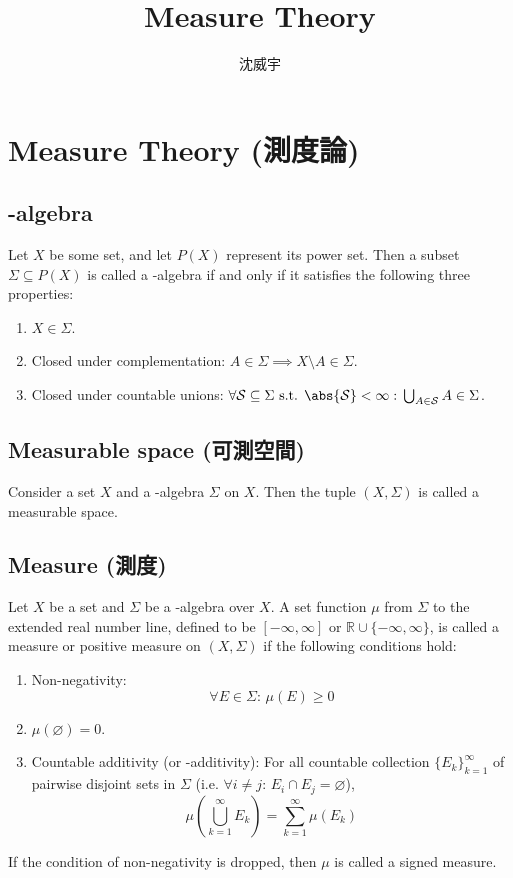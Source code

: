 \documentclass[a4paper,12pt]{article}
\begin{document}
\title{Measure Theory}
\author{沈威宇}
\date{\temtoday}
\titletocdoc
\section{Measure Theory (測度論)}
\subsection{\text{\textsigma}-algebra}
Let $X$ be some set, and let $P(X)$ represent its power set. Then a subset $\Sigma \subseteq P(X)$ is called a \text{\textsigma}-algebra if and only if it satisfies the following three properties:
\begin{enumerate}
\item $X\in\Sigma$.
\item Closed under complementation: $A\in\Sigma\implies X\setminus A\in\Sigma$.
\item Closed under countable unions: \(\forall\mathcal{S}\subseteq\Sigma\text{ s.t. }\abs{\mathcal{S}}<\infty:\,\bigcup_{A\in\mathcal{S}}A\in\Sigma\).
\end{enumerate}
\subsection{Measurable space (可測空間)}
Consider a set $X$ and a \text{\textsigma}-algebra $\Sigma$ on $X$. Then the tuple $(X,\Sigma)$ is called a measurable space.
\subsection{Measure (測度)}
Let $X$ be a set and $\Sigma$ be a \text{\textsigma}-algebra over $X$. A set function $\mu$ from $\Sigma$ to the extended real number line, defined to be $[-\infty,\infty]$ or $\mathbb{R}\cup\{-\infty,\infty\}$, is called a measure or positive measure on $(X,\Sigma)$ if the following conditions hold:
\begin{enumerate}
\item Non-negativity: \[\forall E\in\Sigma:\,\mu(E)\geq 0\]
\item $\mu (\varnothing )=0$.
\item Countable additivity (or \text{\textsigma}-additivity): For all countable collection $\{E_k\}_{k=1}^\infty$ of pairwise disjoint sets in $\Sigma$ (i.e. $\forall i\neq j:\,E_i\cap E_j=\varnothing$),
\[\mu\left(\bigcup_{k=1}^\infty E_k\right)=\sum_{k=1}^\infty\mu(E_k)\]
\end{enumerate}
If the condition of non-negativity is dropped, then $\mu$ is called a signed measure.
\end{document}
